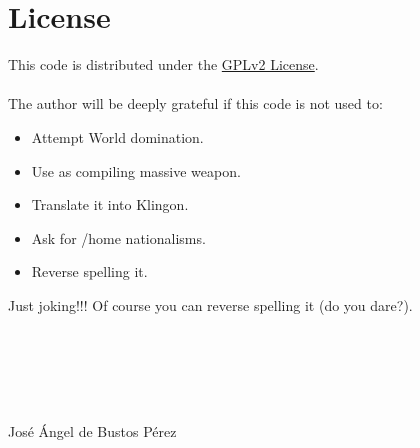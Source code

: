 %
%

\chapter*{License} 

This code is distributed under the \href{http://www.gnu.org/licenses/gpl-2.0.html}{GPLv2 License}.\\ \\
%
The author will be deeply grateful if this code is not used to:
%
\begin{itemize}
\item Attempt World domination.
\item Use as compiling massive weapon.
\item Translate it into Klingon.
\item Ask for /home nationalisms.
\item Reverse spelling it.
\end{itemize}
%
Just joking!!! Of course you can reverse spelling it (do you dare?).

\ \\ \\ \\ \\

\begin{flushright}
Jos\'e \'Angel de Bustos P\'erez  
\end{flushright}
